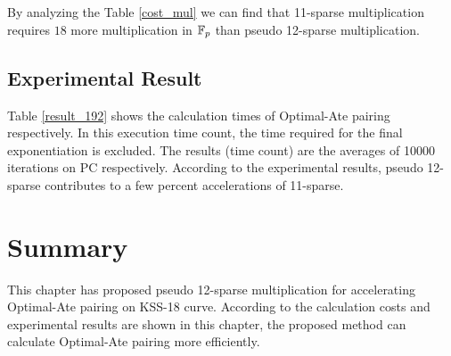 By analyzing the Table \ref{cost_mul} we can find that  11-sparse multiplication requires $18$ more multiplication in ${\mathbb{F}}_{p}$ than pseudo 12-sparse multiplication.
\subsection{Experimental Result}
Table \ref{result_192} shows the calculation times of Optimal-Ate pairing respectively. In this execution time count, the time required for the final exponentiation is excluded. The results (time count) are the averages of 10000 iterations on PC respectively. According to the experimental results, pseudo 12-sparse contributes to a few percent accelerations of 11-sparse.
\renewcommand{\baselinestretch}{1.5}
\begin{table}[ht]
	\begin{center}
		\caption{Calculation time of Optimal-Ate pairing at the 192-bit security level.}
		\label{result_192}
	\end{center}
\end{table}
\renewcommand{\baselinestretch}{1.0}

\section{Summary}
This chapter has proposed pseudo 12-sparse multiplication for accelerating Optimal-Ate pairing on KSS-18 curve. 
According to the calculation costs and experimental results are shown in this chapter, the proposed method can calculate Optimal-Ate pairing more efficiently. 

